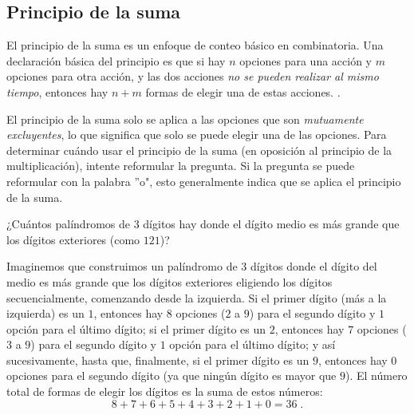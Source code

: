 \documentclass[12pt]{article}
\begin{document}
\subsection{Principio de la suma}
\begin{definicion}
El principio de la suma es un enfoque de conteo básico en combinatoria. Una declaración básica del principio es que si hay $n$ opciones para una acción y $m$ opciones para otra acción, y las dos acciones \textit{no se pueden realizar al mismo tiempo}, entonces hay $n+m$ formas de elegir una de estas acciones. .
\end{definicion}

\begin{obs}
El principio de la suma solo se aplica a las opciones que son \textit{mutuamente excluyentes}, lo que significa que solo se puede elegir una de las opciones. Para determinar cuándo usar el principio de la suma (en oposición al principio de la multiplicación), intente reformular la pregunta. Si la pregunta se puede reformular con la palabra ''o", esto generalmente indica que se aplica el principio de la suma.
\end{obs}

\begin{ejemplo}
¿Cuántos palíndromos de $3$ dígitos hay donde el dígito medio es más grande que los dígitos exteriores (como $121$)?
\end{ejemplo}

\begin{solucion}
Imaginemos que construimos un palíndromo de $3$ dígitos donde el dígito del medio es más grande que los dígitos exteriores eligiendo los dígitos secuencialmente, comenzando desde la izquierda. Si el primer dígito (más a la izquierda) es un $1$, entonces hay $8$ opciones ($2$ a $9$) para el segundo dígito y $1$ opción para el último dígito; si el primer dígito es un $2$, entonces hay $7$ opciones ($3$ a $9$) para el segundo dígito y $1$ opción para el último dígito; y así sucesivamente, hasta que, finalmente, si el primer dígito es un $9$, entonces hay $0$ opciones para el segundo dígito (ya que ningún dígito es mayor que $9$). El número total de formas de elegir los dígitos es la suma de estos números:
\[8+7+6+5+4+3+2+1+0=36\;.\]
\end{solucion}
\end{document}
